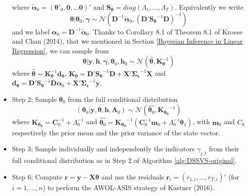 \documentclass[
  12pt,
]{book}
\theoremstyle{break}
\theoremstyle{nonumberplain}
\begin{document}
\begin{itemize}
where $\boldsymbol{\tilde{\alpha}}_{0}=(\boldsymbol{\theta}'_{0},\boldsymbol{0},...\boldsymbol{0})'$ and $\boldsymbol{S_\theta}=diag(\Lambda_{1},...,\Lambda_{T})$.
Equivalently we write
\[\boldsymbol{\theta} | \boldsymbol{\theta}_{0},\boldsymbol{\gamma} \sim \mathcal{N}(\boldsymbol{D}^{-1}\boldsymbol{\tilde{\alpha}}_{0},(\boldsymbol{D}'\boldsymbol{S_\theta}^{-1}\boldsymbol{D})^{-1})\]
and we label $\boldsymbol{\alpha}_{0}=\boldsymbol{D}^{-1}\boldsymbol{\tilde{\alpha}}_{0}$.
Thanks to Corollary 8.1 of Theorem 8.1 of Kroese and Chan (2014), that we mentioned in Section \ref{Bayesian Inference in Linear Regression}, we can sample from 
\[\boldsymbol{\theta} | \boldsymbol{y},\boldsymbol{h},\boldsymbol{\gamma},\boldsymbol{\theta}_{0},\boldsymbol{h}_{0} \sim \mathcal{N}(\hat{\boldsymbol{\theta}},\boldsymbol{K}^{-1}_{\boldsymbol{\theta}})\]
where $\hat{\boldsymbol{\theta}}=\boldsymbol{K}^{-1}_{\boldsymbol{\theta}}\boldsymbol{d}_{\boldsymbol{\theta}}$, $\boldsymbol{K_\theta}=\boldsymbol{D}'\boldsymbol{S_\theta}^{-1}\boldsymbol{D}+\boldsymbol{X}'\boldsymbol{\Sigma_\epsilon}^{-1}\boldsymbol{X}$ and $\boldsymbol{d_\theta}=\boldsymbol{D}'\boldsymbol{S_\theta}^{-1}\boldsymbol{D}\boldsymbol{\alpha}_{0}+\boldsymbol{X}'\boldsymbol{\Sigma_{\epsilon}}^{-1}\boldsymbol{y}$.
\item Step 2; Sample $\boldsymbol{\theta}_{0}$ from the full conditional distribution 
\[
(\boldsymbol{\theta}_{0}|\boldsymbol{y},\boldsymbol{\theta},\boldsymbol{h},\boldsymbol{\Lambda}_{0})\sim\mathcal{N}(\hat{\boldsymbol{\theta}_{0}},\boldsymbol{K_{\theta_{0}}}^{-1})
\]
where $\boldsymbol{K_{\theta_{0}}}=\boldsymbol{C}_{0}^{-1}+\Lambda^{-1}_{0}$ and $\hat{\boldsymbol{\theta}_{0}}=\boldsymbol{K_{\theta_{0}}}^{-1}(\boldsymbol{C}_{0}^{-1}\boldsymbol{m}_{0}+\Lambda_{0}^{-1}\boldsymbol{\theta}_{1})$, with $\boldsymbol{m}_{0}$ and $C_{0}$ respectively the prior mean and the prior variance of the state vector.
\item Step 3; Sample individually and independently the indicators $\gamma_{j,t}$ from their full conditional distribution as in Step 2 of Algorithm \ref{alg:DSSVS-original}.
\item Step 6; Compute $\boldsymbol{r}=\boldsymbol{y}-\boldsymbol{X}\boldsymbol{\theta}$ and use the residuals $\boldsymbol{r}_{i}=(r_{1,i},...,r_{T,i})'$ (for $i=1,...,n$) to perform the AWOL-ASIS strategy of Kastner (2016).
\end{itemize}
\end{document}
